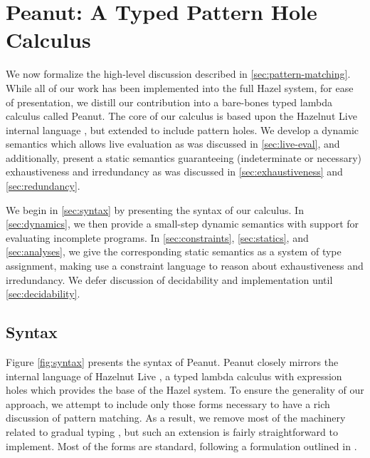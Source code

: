 \section{Peanut: A Typed Pattern Hole Calculus}\label{sec:peanut}
We now formalize the high-level discussion described in \autoref{sec:pattern-matching}. While all of our work has been implemented into the full Hazel system, for ease of presentation, we distill our contribution into a bare-bones typed lambda calculus called Peanut. The core of our calculus is based upon the Hazelnut Live internal language \cite{DBLP:journals/pacmpl/OmarVCH19}, but extended to include pattern holes. We develop a dynamic semantics which allows live evaluation as was discussed in \autoref{sec:live-eval}, and additionally, present a static semantics guaranteeing (indeterminate or necessary) exhaustiveness and irredundancy as was discussed in \autoref{sec:exhaustiveness} and \autoref{sec:redundancy}. 

We begin in \autoref{sec:syntax} by presenting the syntax of our calculus. In \autoref{sec:dynamics}, we then provide a small-step dynamic semantics with support for evaluating incomplete programs. In \autoref{sec:constraints}, \autoref{sec:statics}, and \autoref{sec:analyses}, we give the corresponding static semantics as a system of type assignment, making use a constraint language to reason about exhaustiveness and irredundancy. We defer discussion of decidability and implementation until \autoref{sec:decidability}.

\subsection{Syntax}\label{sec:syntax}



Figure \ref{fig:syntax} presents the syntax of Peanut. Peanut closely mirrors the internal language of Hazelnut Live \cite{DBLP:journals/pacmpl/OmarVCH19}, a typed lambda calculus with expression holes which provides the base of the Hazel system. To ensure the generality of our approach, we attempt to include only those forms necessary to have a rich discussion of pattern matching. As a result, we remove most of the machinery related to gradual typing \cite{DBLP:conf/snapl/SiekVCB15}, but such an extension is fairly straightforward to implement. Most of the forms are standard, following a formulation outlined in \cite{Harper2012}. 

